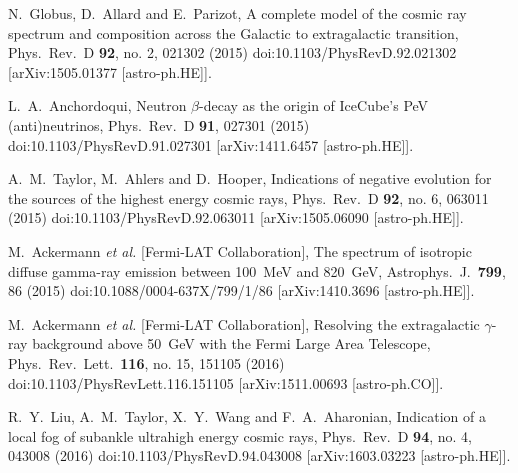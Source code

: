 \documentclass[aps,prd,twocolumn,superscriptaddress,tightenlines,nofootinbib]{revtex4-1}
\begin{document}
\begin{thebibliography}{99}
  N.~Globus, D.~Allard and E.~Parizot,
  {\color{rossoCP3} A complete model of the cosmic ray spectrum and composition across the Galactic to extragalactic transition},
  Phys.\ Rev.\ D {\bf 92}, no. 2, 021302 (2015)
  doi:10.1103/PhysRevD.92.021302
  [arXiv:1505.01377 [astro-ph.HE]].


  L.~A.~Anchordoqui,
   {\color{rossoCP3} Neutron $\beta$-decay as the origin of IceCube’s PeV (anti)neutrinos},
  Phys.\ Rev.\ D {\bf 91}, 027301 (2015)
  doi:10.1103/PhysRevD.91.027301
  [arXiv:1411.6457 [astro-ph.HE]].

  A.~M.~Taylor, M.~Ahlers and D.~Hooper,
  {\color{rossoCP3} Indications of negative evolution for the sources of the highest energy cosmic rays},
  Phys.\ Rev.\ D {\bf 92}, no. 6, 063011 (2015)
  doi:10.1103/PhysRevD.92.063011
  [arXiv:1505.06090 [astro-ph.HE]].


  M.~Ackermann {\it et al.} [Fermi-LAT Collaboration],
   {\color{rossoCP3} The spectrum of isotropic diffuse gamma-ray emission between 100~MeV and 820~GeV},
  Astrophys.\ J.\  {\bf 799}, 86 (2015)
  doi:10.1088/0004-637X/799/1/86
  [arXiv:1410.3696 [astro-ph.HE]].


  M.~Ackermann {\it et al.} [Fermi-LAT Collaboration],
   {\color{rossoCP3} Resolving the extragalactic $\gamma$-ray background above 50~GeV with the Fermi Large Area Telescope},
  Phys.\ Rev.\ Lett.\  {\bf 116}, no. 15, 151105 (2016)
  doi:10.1103/PhysRevLett.116.151105
  [arXiv:1511.00693 [astro-ph.CO]].



  R.~Y.~Liu, A.~M.~Taylor, X.~Y.~Wang and F.~A.~Aharonian,
    {\color{rossoCP3} Indication of a local fog of subankle ultrahigh energy cosmic rays},
  Phys.\ Rev.\ D {\bf 94}, no. 4, 043008 (2016)
  doi:10.1103/PhysRevD.94.043008
  [arXiv:1603.03223 [astro-ph.HE]].










\end{thebibliography}
\end{document}
